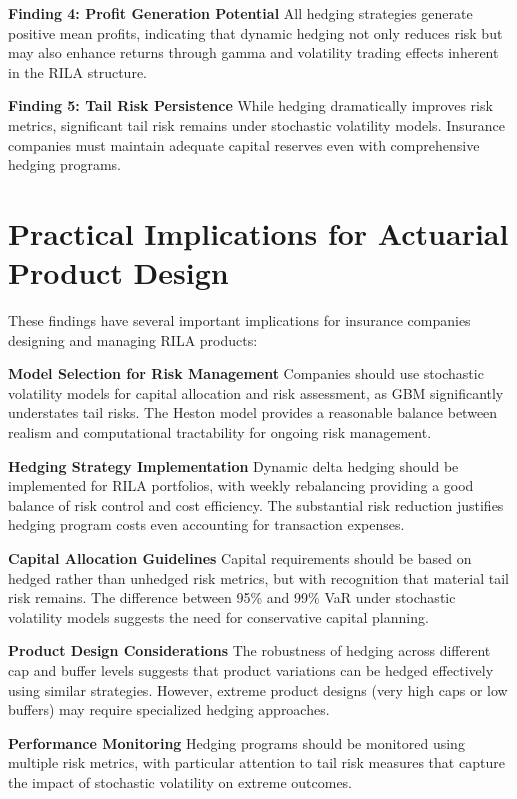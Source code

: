 \documentclass[12pt,a4paper]{report}
\begin{document}
\textbf{Finding 4: Profit Generation Potential}
All hedging strategies generate positive mean profits, indicating that dynamic hedging not only reduces risk but may also enhance returns through gamma and volatility trading effects inherent in the RILA structure.

\textbf{Finding 5: Tail Risk Persistence}
While hedging dramatically improves risk metrics, significant tail risk remains under stochastic volatility models. Insurance companies must maintain adequate capital reserves even with comprehensive hedging programs.

\section{Practical Implications for Actuarial Product Design}

These findings have several important implications for insurance companies designing and managing RILA products:

\textbf{Model Selection for Risk Management}
Companies should use stochastic volatility models for capital allocation and risk assessment, as GBM significantly understates tail risks. The Heston model provides a reasonable balance between realism and computational tractability for ongoing risk management.

\textbf{Hedging Strategy Implementation}
Dynamic delta hedging should be implemented for RILA portfolios, with weekly rebalancing providing a good balance of risk control and cost efficiency. The substantial risk reduction justifies hedging program costs even accounting for transaction expenses.

\textbf{Capital Allocation Guidelines}
Capital requirements should be based on hedged rather than unhedged risk metrics, but with recognition that material tail risk remains. The difference between 95\% and 99\% VaR under stochastic volatility models suggests the need for conservative capital planning.

\textbf{Product Design Considerations}
The robustness of hedging across different cap and buffer levels suggests that product variations can be hedged effectively using similar strategies. However, extreme product designs (very high caps or low buffers) may require specialized hedging approaches.

\textbf{Performance Monitoring}
Hedging programs should be monitored using multiple risk metrics, with particular attention to tail risk measures that capture the impact of stochastic volatility on extreme outcomes.
\end{document}
